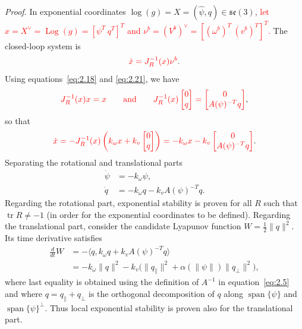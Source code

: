 \documentclass[11pt]{article}
\newcommand{\rev}[1]{\textcolor{red}{#1}}
\newcommand{\JR}{J_R}
\newcommand{\Log}{\operatorname{Log}}
\newcommand{\se}{\mathfrak{se}}
\newcommand{\tr}{\operatorname{tr}}
\begin{document}
\emph{Proof.} In exponential coordinates $\log(g)=X=(\widehat\psi,q)\in\se(3)$,
\rev{let $x=X^\vee=\Log(g)=[\psi^T\ q^T]^T$ and $\nu^b=(V^b)^\vee=[(\omega^b)^T\ (v^b)^T]^T$.} The closed-loop system is
\begin{equation*}
\rev{\dot x=\JR^{-1}(x)\nu^b}.
\end{equation*}
Using equations~\eqref{eq:2.18} and \eqref{eq:2.21}, we have
\begin{equation*}
\rev{\JR^{-1}(x)x=x\qquad\text{and}\qquad
\JR^{-1}(x)\begin{bmatrix}0\\q\end{bmatrix}
=\begin{bmatrix}0\\A(\psi)^{-T}q\end{bmatrix}},
\end{equation*}
so that
\begin{equation*}
\rev{\dot x=-\JR^{-1}(x)\left(k_\omega x+k_v\begin{bmatrix}0\\q\end{bmatrix}\right)
=-k_\omega x-k_v\begin{bmatrix}0\\A(\psi)^{-T}q\end{bmatrix}}.
\end{equation*}
Separating the rotational and translational parts
\begin{align*}
\dot\psi &=-k_\omega\psi,\\
\dot q &=-k_\omega q-k_vA(\psi)^{-T}q.
\end{align*}
Regarding the rotational part, exponential stability is proven for all $R$ such that $\tr R\neq-1$ (in order for the exponential coordinates to be defined). Regarding the translational part, consider the candidate Lyapunov function $W=\tfrac12\|q\|^2$. Its time derivative satisfies
\begin{align*}
\frac{d}{dt}W&=-\langle q,k_\omega q+k_vA(\psi)^{-T}q\rangle\\
&=-k_\omega\|q\|^2-k_v\bigl(\|q_{\parallel}\|^2+\alpha(\|\psi\|)\|q_{\perp}\|^2\bigr),
\end{align*}
where last equality is obtained using the definition of $A^{-1}$ in equation~\eqref{eq:2.5} and where $q=q_{\parallel}+q_{\perp}$ is the orthogonal decomposition of $q$ along $\operatorname{span}\{\psi\}$ and $\operatorname{span}\{\psi\}^{\perp}$. Thus local exponential stability is proven also for the translational part.
\end{document}
